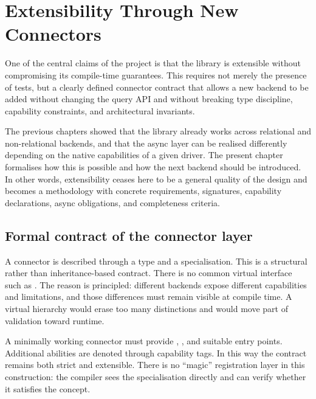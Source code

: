 \section{Extensibility Through New Connectors}
\label{sec:verification_extensibility}

One of the central claims of the project is that the library is extensible without compromising its compile-time guarantees. This requires not merely the presence of tests, but a clearly defined connector contract that allows a new backend to be added without changing the query API and without breaking type discipline, capability constraints, and architectural invariants.

The previous chapters showed that the library already works across relational and non-relational backends, and that the async layer can be realised differently depending on the native capabilities of a given driver. The present chapter formalises how this is possible and how the next backend should be introduced. In other words, extensibility ceases here to be a general quality of the design and becomes a methodology with concrete requirements, signatures, capability declarations, async obligations, and completeness criteria.

\subsection{Formal contract of the connector layer}

A connector is described through a  type and a  specialisation. This is a structural rather than inheritance-based contract. There is no common virtual interface such as . The reason is principled: different backends expose different capabilities and limitations, and those differences must remain visible at compile time. A virtual hierarchy would erase too many distinctions and would move part of validation toward runtime.

A minimally working connector must provide , , and suitable  entry points. Additional abilities are denoted through capability tags. In this way the contract remains both strict and extensible. There is no ``magic'' registration layer in this construction: the compiler sees the specialisation directly and can verify whether it satisfies the  concept.

